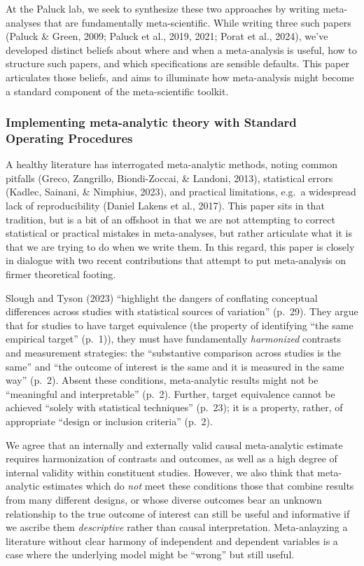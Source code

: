 \documentclass[
  man]{apa6}
\begin{document}
At the Paluck lab, we seek to synthesize these two approaches by writing meta-analyses that are fundamentally meta-scientific. While writing three such papers (Paluck \& Green, 2009; Paluck et al., 2019, 2021; Porat et al., 2024), we've developed distinct beliefs about where and when a meta-analysis is useful, how to structure such papers, and which specifications are sensible defaults. This paper articulates those beliefs, and aims to illuminate how meta-analysis might become a standard component of the meta-scientific toolkit.

\subsubsection{Implementing meta-analytic theory with Standard Operating Procedures}\label{implementing-meta-analytic-theory-with-standard-operating-procedures}

A healthy literature has interrogated meta-analytic methods, noting common pitfalls (Greco, Zangrillo, Biondi-Zoccai, \& Landoni, 2013), statistical errors (Kadlec, Sainani, \& Nimphius, 2023), and practical limitations, e.g.~a widespread lack of reproducibility (Daniel Lakens et al., 2017). This paper sits in that tradition, but is a bit of an offshoot in that we are not attempting to correct statistical or practical mistakes in meta-analyses, but rather articulate what it is that we are trying to do when we write them. In this regard, this paper is closely in dialogue with two recent contributions that attempt to put meta-analysis on firmer theoretical footing.

Slough and Tyson (2023) ``highlight the dangers of conflating conceptual differences across studies with statistical sources of variation'' (p.~29). They argue that for studies to have target equivalence (the property of identifying ``the same empirical target'' (p.~1)), they must have fundamentally \emph{harmonized} contrasts and measurement strategies: the ``substantive comparison across studies is the same'' and ``the outcome of interest is the same and it is measured in the same way'' (p.~2). Absent these conditions, meta-analytic results might not be ``meaningful and interpretable'' (p.~2). Further, target equivalence cannot be achieved ``solely with statistical techniques'' (p.~23); it is a property, rather, of appropriate ``design or inclusion criteria'' (p.~2).

We agree that an internally and externally valid causal meta-analytic estimate requires harmonization of contrasts and outcomes, as well as a high degree of internal validity within constituent studies. However, we also think that meta-analytic estimates which do \emph{not} meet these conditions \textemdash those that combine results from many different designs, or whose diverse outcomes bear an unknown relationship to the true outcome of interest \textemdash can still be useful and informative if we ascribe them \emph{descriptive} rather than causal interpretation. Meta-anlayzing a literature without clear harmony of independent and dependent variables is a case where the underlying model might be ``wrong'' but still useful.
\end{document}
